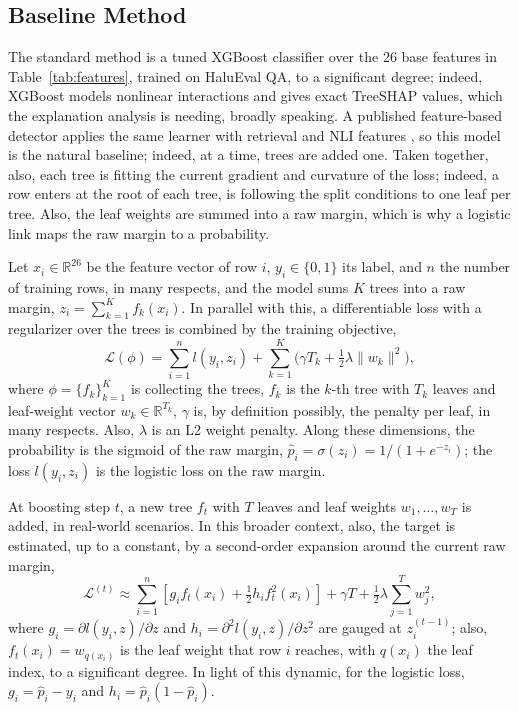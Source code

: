 \documentclass[a4paper,fleqn]{cas-sc}
\begin{document}
\subsection{Baseline Method}

The standard method is a tuned XGBoost classifier \cite{xgboost} over the 26 base features in Table~\ref{tab:features}, trained on HaluEval QA, to a significant degree; indeed, XGBoost models nonlinear interactions and gives exact TreeSHAP values, which the explanation analysis is needing, broadly speaking. A published feature-based detector applies the same learner with retrieval and NLI features \cite{ijert}, so this model is the natural baseline; indeed, at a time, trees are added one. Taken together, also, each tree is fitting the current gradient and curvature of the loss; indeed, a row enters at the root of each tree, is following the split conditions to one leaf per tree. Also, the leaf weights are summed into a raw margin, which is why a logistic link maps the raw margin to a probability.

Let $x_i \in \mathbb{R}^{26}$ be the feature vector of row $i$, $y_i \in \{0,1\}$ its label, and $n$ the number of training rows, in many respects, and the model sums $K$ trees into a raw margin, $z_i = \sum_{k=1}^{K} f_k(x_i)$. In parallel with this, a differentiable loss with a regularizer over the trees is combined by the training objective,
\begin{equation}
  \mathcal{L}(\phi) = \sum_{i=1}^{n} l(y_i, z_i) + \sum_{k=1}^{K} \big( \gamma T_k + \tfrac{1}{2}\lambda \lVert w_k \rVert^2 \big),
\end{equation}
where $\phi = \{f_k\}_{k=1}^{K}$ is collecting the trees, $f_k$ is the $k$-th tree with $T_k$ leaves and leaf-weight vector $w_k \in \mathbb{R}^{T_k}$, $\gamma$ is, by definition possibly, the penalty per leaf, in many respects. Also, $\lambda$ is an L2 weight penalty. Along these dimensions, the probability is the sigmoid of the raw margin, $\hat{p}_i = \sigma(z_i) = 1/(1 + e^{-z_i})$; the loss $l(y_i,z_i)$ is the logistic loss on the raw margin.

At boosting step $t$, a new tree $f_t$ with $T$ leaves and leaf weights $w_1,\dots,w_T$ is added, in real-world scenarios. In this broader context, also, the target is estimated, up to a constant, by a second-order expansion around the current raw margin,
\begin{equation}
  \mathcal{L}^{(t)} \approx \sum_{i=1}^{n} \left[ g_i f_t(x_i) + \tfrac{1}{2} h_i f_t^2(x_i) \right] + \gamma T + \tfrac{1}{2}\lambda \sum_{j=1}^{T} w_j^2,
\end{equation}
where $g_i = \partial l(y_i,z)/\partial z$ and $h_i = \partial^2 l(y_i,z)/\partial z^2$ are gauged at $z_i^{(t-1)}$; also, $f_t(x_i) = w_{q(x_i)}$ is the leaf weight that row $i$ reaches, with $q(x_i)$ the leaf index, to a significant degree. In light of this dynamic, for the logistic loss, $g_i = \hat{p}_i - y_i$ and $h_i = \hat{p}_i(1-\hat{p}_i)$.
\end{document}
